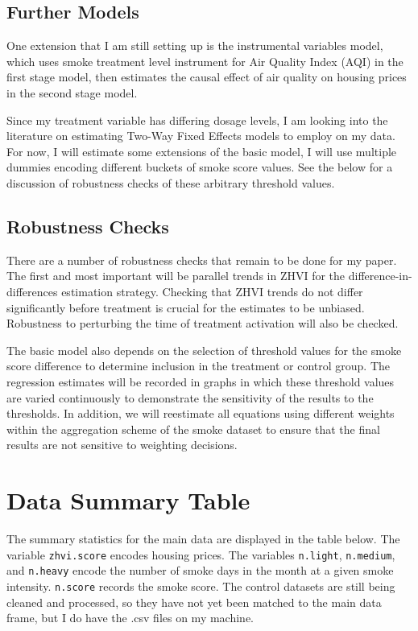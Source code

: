 \documentclass[12pt]{article}
\begin{document}
\subsection{Further Models}
One extension that I am still setting up is the instrumental variables model,
which uses smoke treatment level instrument for Air Quality Index (AQI) in the 
first stage model, then estimates the causal effect of air quality on housing
prices in the second stage model.  

Since my treatment variable has differing dosage levels, I am looking into the 
literature on estimating Two-Way Fixed Effects models to employ on my data.  For now, I will
estimate some extensions of the basic model, I will use multiple dummies encoding different buckets of smoke score values.  See the below for a discussion of robustness checks of these arbitrary threshold values.

\subsection{Robustness Checks}
There are a number of robustness checks that remain to be done for my paper.  The
first and most important will be parallel trends in ZHVI for the difference-in-differences
estimation strategy.  Checking that ZHVI trends do not differ significantly before treatment
is crucial for the estimates to be unbiased.  Robustness to perturbing the time of treatment
activation will also be checked.

The basic model also depends on the selection of threshold values for the smoke score difference to determine inclusion in the treatment or control group.  The regression estimates will be recorded in graphs in which these threshold values are varied continuously to demonstrate the sensitivity of the results to the thresholds.  In addition, we will reestimate all equations using different weights within the aggregation scheme of the smoke dataset to ensure that the final results are not sensitive to weighting decisions.

\section{Data Summary Table}

The summary statistics for the main data are displayed in the table below. The variable \lstinline{zhvi.score} encodes housing prices. The variables \lstinline{n.light}, \lstinline{n.medium}, and \lstinline{n.heavy} encode the number of smoke days in the month at a given smoke intensity.  \lstinline{n.score} records the smoke score.  The control datasets are still being cleaned and processed, so they have not yet been matched to the main data frame, but I do have the .csv files on my machine.  
\end{document}
